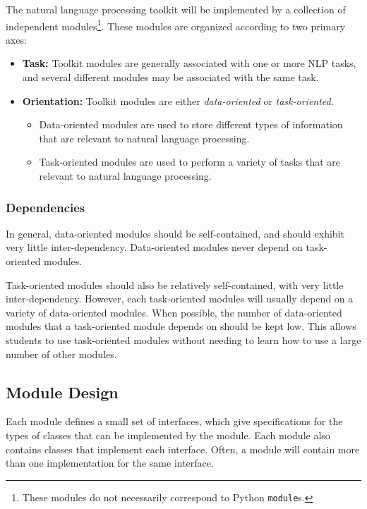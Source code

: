 \documentclass{article}
\begin{document}
The natural language processing toolkit will be implemented by a
collection of independent modules\footnote{These modules do not
necessarily correspond to Python \texttt{module}s.}.  These modules are
organized according to two primary axes:

\begin{itemize}
  \item \textbf{Task:} Toolkit modules are generally associated with
  one or more NLP tasks, and several different modules may be
  associated with the same task.

  \item \textbf{Orientation:} Toolkit modules are either
  \emph{data-oriented} or \emph{task-oriented}.

  \begin{itemize}
    \item Data-oriented modules are used to store different types of
    information that are relevant to natural language processing.
    \item Task-oriented modules are used to perform a variety of tasks 
    that are relevant to natural language processing.
  \end{itemize}
\end{itemize}

\subsubsection{Dependencies}

In general, data-oriented modules should be self-contained, and should
exhibit very little inter-dependency.  Data-oriented modules never
depend on task-oriented modules.

Task-oriented modules should also be relatively self-contained, with
very little inter-dependency.  However, each task-oriented modules
will usually depend on a variety of data-oriented modules.  When
possible, the number of data-oriented modules that a task-oriented
module depends on should be kept low.  This allows students to use
task-oriented modules without needing to learn how to use a large
number of other modules.

\subsection{Module Design}

Each module defines a small set of interfaces, which give
specifications for the types of classes that can be implemented by the
module.  Each module also contains classes that implement each
interface.  Often, a module will contain more than one implementation
for the same interface.
\end{document}
